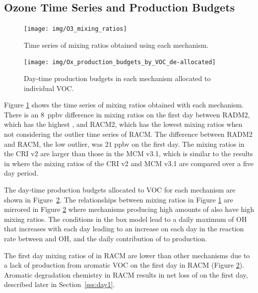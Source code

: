 %
\subsection[O3 Time Series and Ox Production Budgets]{Ozone Time Series and  Production Budgets} \label{ss:O3_time_series}
%
\begin{figure}
    \centering
    \caption{Time series of  mixing ratios obtained using each mechanism.}
    \texttt{[image: img/O3\_mixing\_ratios]}
    \vspace{-2mm}
    \label{f:time_series}
\end{figure}
%
\begin{figure}
    \centering
    \texttt{[image: img/Ox\_production\_budgets\_by\_VOC\_de-allocated]}
    \vspace{1mm}
    \caption{Day-time  production budgets in each mechanism allocated to individual VOC.}
    \vspace{-4mm}
    \label{f:Ox_tagged_budgets}
\end{figure}
%
Figure \ref{f:time_series} shows the time series of  mixing ratios obtained with each mechanism.
There is an \mbox{$8$ ppbv} difference in  mixing ratios on the first day between RADM2, which has the highest , and RACM2, which has the lowest  mixing ratios when not considering the outlier time series of RACM.
The difference between RADM2 and RACM, the low outlier, was $21$ ppbv on the first day.
The  mixing ratios in the CRI v2 are larger than those in the MCM v3.1, which is similar to the results in \citet{Jenkin:2008} where the  mixing ratios of the CRI v2 and MCM v3.1 are compared over a five day period.

The day-time  production budgets allocated to VOC for each mechanism are shown in \mbox{Figure \ref{f:Ox_tagged_budgets}}.
The relationships between  mixing ratios in Figure \ref{f:time_series} are mirrored in Figure \ref{f:Ox_tagged_budgets} where mechanisms producing high amounts of  also have high  mixing ratios.
The conditions in the box model lead to a daily maximum of OH that increases with each day leading to an increase on each day in the reaction rate between  and OH, and the daily contribution of  to  production.

The first day mixing ratios of  in RACM are lower than other mechanisms due to a lack of  production from aromatic VOC on the first day in RACM (Figure \ref{f:Ox_tagged_budgets}).
Aromatic degradation chemistry in RACM results in net loss of  on the first day, described later in \mbox{Section \ref{sss:day1}}.

